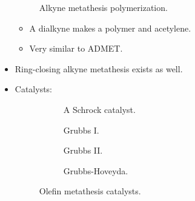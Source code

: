 \documentclass[../notes.tex]{subfiles}
\begin{document}
\begin{itemize}
\begin{figure}[H]
            \+
        \schemestop
        \caption{Alkyne metathesis polymerization.}
        \label{fig:alkyneMetathesisPolymerization}
    \end{figure}
    \begin{itemize}
        \item A dialkyne makes a polymer and acetylene.
        \item Very similar to ADMET.
    \end{itemize}
    \item Ring-closing alkyne metathesis exists as well.
    \item Catalysts:
    \begin{figure}[h!]
        \centering
        \begin{subfigure}[b]{0.25\linewidth}
            \centering
            \caption{A Schrock catalyst.}
            \label{fig:olefinMetathesisCatalystsa}
        \end{subfigure}
        \begin{subfigure}[b]{0.2\linewidth}
            \centering
            \caption{Grubbs I.}
            \label{fig:olefinMetathesisCatalystsb}
        \end{subfigure}
        \begin{subfigure}[b]{0.26\linewidth}
            \centering
            \caption{Grubbs II.}
            \label{fig:olefinMetathesisCatalystsc}
        \end{subfigure}
        \begin{subfigure}[b]{0.27\linewidth}
            \centering
            \caption{Grubbs-Hoveyda.}
            \label{fig:olefinMetathesisCatalystsd}
        \end{subfigure}
        \caption{Olefin metathesis catalysts.}
        \label{fig:olefinMetathesisCatalysts}
    \end{figure}
    \begin{enumerate}

\end{enumerate}
\end{itemize}
\end{document}
